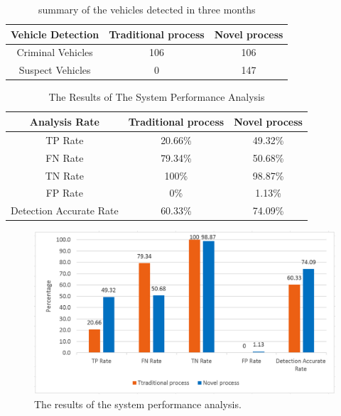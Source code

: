 \begin{table}[!t]
\renewcommand{\arraystretch}{1.2}
\caption{summary of the vehicles detected in three months}
\label{table_vehiclesDetected}
\centering
\begin{tabular}{c|c|c}
\hline
\bfseries Vehicle Detection & \bfseries Traditional process & \bfseries Novel process\\
\hline
Criminal Vehicles & 106 & 106\\
\hline
Suspect Vehicles & 0 & 147\\
\hline
\end{tabular}
\end{table}

\begin{table}[!t]
\renewcommand{\arraystretch}{1.2}
\caption{The Results of The System Performance Analysis}
\label{table_results}
\centering
\begin{tabular}{c|c|c}
\hline
\bfseries Analysis Rate & \bfseries Traditional process & \bfseries Novel process\\
\hline
TP Rate & 20.66\% & 49.32\%\\
\hline
FN Rate & 79.34\% & 50.68\%\\
\hline
TN Rate & 100\% & 98.87\%\\
\hline
FP Rate & 0\% & 1.13\%\\
\hline
Detection Accurate Rate & 60.33\% & 74.09\%\\
\hline
\end{tabular}
\end{table}

\begin{figure}
\centering
\includegraphics[width=1\textwidth]{images/results.jpg}
\caption{The results of the system performance analysis.}
\label{fig:graphresults}
\end{figure}

